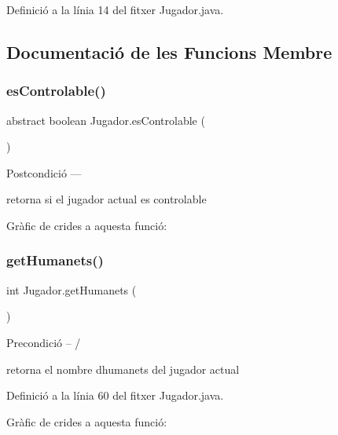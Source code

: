 Definició a la línia 14 del fitxer Jugador.\+java.



\subsection{Documentació de les Funcions Membre}
\mbox{\label{class_jugador_a35b3082524dca77c1a666d31358bf520}} 
\subsubsection{\texorpdfstring{es\+Controlable()}{esControlable()}}
{\footnotesize\ttfamily abstract boolean Jugador.\+es\+Controlable (\begin{DoxyParamCaption}{ }\end{DoxyParamCaption})\hspace{0.3cm}{\ttfamily [abstract]}}

\begin{DoxyPostcond}{Postcondició}
--- 

retorna si el jugador actual es controlable 
\end{DoxyPostcond}
Gràfic de crides a aquesta funció\+:
\mbox{\label{class_jugador_a07a0c155b480c9822ae8cf6b8649f688}} 
\subsubsection{\texorpdfstring{get\+Humanets()}{getHumanets()}}
{\footnotesize\ttfamily int Jugador.\+get\+Humanets (\begin{DoxyParamCaption}{ }\end{DoxyParamCaption})}

\begin{DoxyPrecond}{Precondició}
-- /

retorna el nombre d\textquotesingle{}humanets del jugador actual 
\end{DoxyPrecond}


Definició a la línia 60 del fitxer Jugador.\+java.

Gràfic de crides a aquesta funció\+:
\mbox{\label{class_jugador_a94e3e666866e80e3a47fead1195de821}} 
